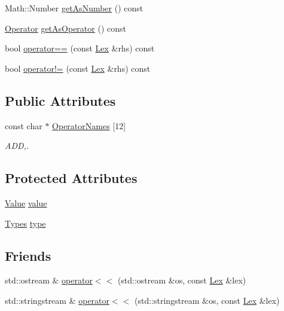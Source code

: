 \begin{DoxyCompactItemize}
Math\+::\+Number \hyperlink{classteam22_1_1_calc_1_1_lex_a794e75373451a906a2cfc60e5d6b1996}{get\+As\+Number} () const
\item 
\hyperlink{classteam22_1_1_calc_1_1_lex_a61d29fc4878a3b36d2de2f13c56ed932}{Operator} \hyperlink{classteam22_1_1_calc_1_1_lex_afdeee7e9b13fcb9826d4d8fd7d5f141f}{get\+As\+Operator} () const
\item 
bool \hyperlink{classteam22_1_1_calc_1_1_lex_a55858e2719cb121fccff59eed42dd692}{operator==} (const \hyperlink{classteam22_1_1_calc_1_1_lex}{Lex} \&rhs) const
\item 
bool \hyperlink{classteam22_1_1_calc_1_1_lex_a25b4f3b98b68c4d967eb3695efc78667}{operator!=} (const \hyperlink{classteam22_1_1_calc_1_1_lex}{Lex} \&rhs) const
\end{DoxyCompactItemize}
\subsection*{Public Attributes}
\begin{DoxyCompactItemize}
\item 
const char $\ast$ \hyperlink{classteam22_1_1_calc_1_1_lex_a9d280854466641dfb02159cc4afeec1f}{Operator\+Names} \mbox{[}12\mbox{]}
\begin{DoxyCompactList}\small\item\em A\+DD,. \end{DoxyCompactList}\end{DoxyCompactItemize}
\subsection*{Protected Attributes}
\begin{DoxyCompactItemize}
\item 
\hyperlink{unionteam22_1_1_calc_1_1_lex_1_1_value}{Value} \hyperlink{classteam22_1_1_calc_1_1_lex_a8a78a736b719931cada0905ac13fedc8}{value}
\item 
\hyperlink{classteam22_1_1_calc_1_1_lex_a295984577c98a23ddd20ee36d33145a2}{Types} \hyperlink{classteam22_1_1_calc_1_1_lex_a733fda9ebfa5ed6f588457d0870e81bc}{type}
\end{DoxyCompactItemize}
\subsection*{Friends}
\begin{DoxyCompactItemize}
\item 
std\+::ostream \& \hyperlink{classteam22_1_1_calc_1_1_lex_aca03505bafd6049109d56fd123d2dae6}{operator$<$$<$} (std\+::ostream \&os, const \hyperlink{classteam22_1_1_calc_1_1_lex}{Lex} \&lex)
\item 
std\+::stringstream \& \hyperlink{classteam22_1_1_calc_1_1_lex_a75f9b47ca9b4289a569608f62336b3dd}{operator$<$$<$} (std\+::stringstream \&os, const \hyperlink{classteam22_1_1_calc_1_1_lex}{Lex} \&lex)
\end{DoxyCompactItemize}


